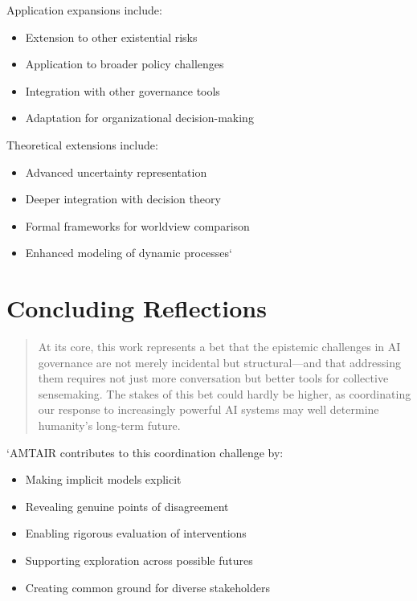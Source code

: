 \documentclass[12pt,a4paper]{report}
\providecommand{\tightlist}{%
  \setlength{\itemsep}{0pt}\setlength{\parskip}{0pt}}
\begin{document}
Application expansions include:

\begin{itemize}
\tightlist
\item
  Extension to other existential risks
\item
  Application to broader policy challenges
\item
  Integration with other governance tools
\item
  Adaptation for organizational decision-making
\end{itemize}

Theoretical extensions include:

\begin{itemize}
\tightlist
\item
  Advanced uncertainty representation
\item
  Deeper integration with decision theory
\item
  Formal frameworks for worldview comparison
\item
  Enhanced modeling of dynamic processes`
\end{itemize}

\section{Concluding Reflections}\label{sec-concluding-reflections}

\begin{quote}
At its core, this work represents a bet that the epistemic challenges in
AI governance are not merely incidental but structural---and that
addressing them requires not just more conversation but better tools for
collective sensemaking. The stakes of this bet could hardly be higher,
as coordinating our response to increasingly powerful AI systems may
well determine humanity's long-term future.
\end{quote}

`AMTAIR contributes to this coordination challenge by:

\begin{itemize}
\tightlist
\item
  Making implicit models explicit
\item
  Revealing genuine points of disagreement
\item
  Enabling rigorous evaluation of interventions
\item
  Supporting exploration across possible futures
\item
  Creating common ground for diverse stakeholders
\end{itemize}
\end{document}
